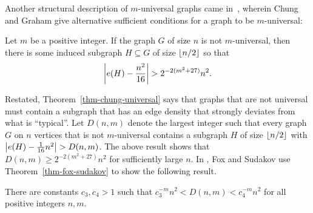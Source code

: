 Another structural description of $m$-universal graphs came in~\cite{chung:on-graphs-not:}, wherein Chung and Graham give alternative sufficient conditions for a graph to be $m$-universal:
\begin{theorem}
\label{thm-chung-universal}
Let $m$ be a positive integer. If the graph $G$ of size $n$ is not $m$-universal, then there is some induced subgraph $H \subseteq G$ of size ${\left\lfloor{n/2}\right\rfloor}$ so that
\[
	\left\lvert{e(H) - \frac{n^2}{16}}\right\rvert
	> 
	2^{-2(m^2+27)}n^2.
\]
\end{theorem}
Restated, Theorem~\ref{thm-chung-universal} says that graphs that are not universal must contain a subgraph that has an edge density that strongly deviates from what is ``typical''. Let $D(n, m)$ denote the largest integer such that every graph $G$ on $n$ vertices that is not $m$-universal contains a subgraph $H$ of size ${\left\lfloor{n/2}\right\rfloor}$ with $\left\lvert{e(H)-\frac{1}{16}n^2}\right\rvert > D(n, m)$. The above result shows that $D(n, m) \ge 2^{-2(m^2+27)}n^2$ for sufficiently large $n$. In \cite{fox:induced-Ramsey-type:}, Fox and Sudakov use Theorem~\ref{thm-fox-sudakov} to show the following result.
\begin{proposition}
\label{prop-fox-sudakov-d}
There are constants $c_3, c_4 > 1$ such that $c_3^{-m}n^2 < D(n,m) < c_4^{-m}n^2$ for all positive integers $n, m$.
\end{proposition}
